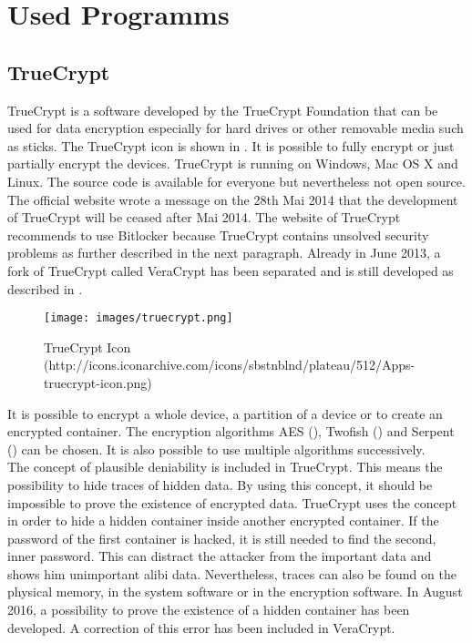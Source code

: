 

\section{Used Programms}


\subsection{TrueCrypt}
TrueCrypt is a software developed by the TrueCrypt Foundation that can be used for data encryption especially for hard drives or other removable media such as sticks. The TrueCrypt icon is shown in . It is possible to fully encrypt or just partially encrypt the devices. TrueCrypt is running on Windows, Mac OS X and Linux. The source code is available for everyone but nevertheless not open source. The official website wrote a message on the 28th Mai 2014 that the development of TrueCrypt will be ceased after Mai 2014. 
The website of TrueCrypt recommends to use Bitlocker because TrueCrypt contains unsolved security problems as further described in the next paragraph. 
Already in June 2013, a fork of TrueCrypt called VeraCrypt has been separated and is still developed as described in . \\

\begin{figure}[h!]
	\centering
	\texttt{[image: images/truecrypt.png]}
	\caption{TrueCrypt Icon (http://icons.iconarchive.com/icons/sbstnblnd/plateau/512/Apps-truecrypt-icon.png)}
	\label{fig:truecrypt}
\end{figure}


It is possible to encrypt a whole device, a partition of a device or to create an encrypted container. The encryption algorithms AES (), Twofish () and Serpent () can be chosen. It is also possible to use multiple algorithms successively. \\

The concept of plausible deniability is included in TrueCrypt. This means the possibility to hide traces of hidden data. By using this concept, it should be impossible to prove the existence of encrypted data. TrueCrypt uses the concept in order to hide a hidden container inside another encrypted container. If the password of the first container is hacked, it is still needed to find the second, inner password. This can distract the attacker from the important data and shows him unimportant alibi data. Nevertheless, traces can also be found on the physical memory, in the system software or in the encryption software. In August 2016, a possibility to prove the existence of a hidden container has been developed. A correction of this error has been included in VeraCrypt. \\

